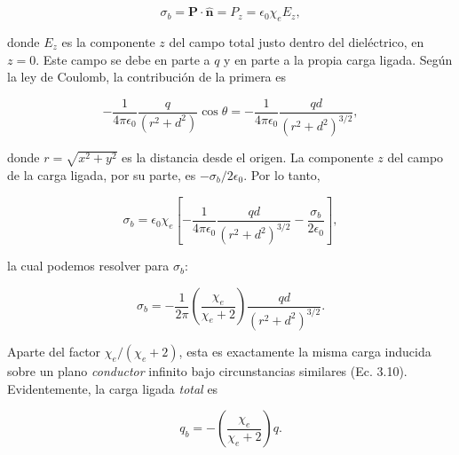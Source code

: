 \documentclass[12pt,a4paper]{report}
\newcommand{\esp}{\vspace{0.5cm}}
\begin{document}
	\esp
	
	\begin{equation}
		\sigma_b = \mathbf{P} \cdot \hat{\mathbf{n}} = P_z = \epsilon_0 \chi_e E_z,
	\end{equation}
	
	\esp
	
	\noindent donde $E_z$ es la componente $z$ del campo total justo dentro del dieléctrico, en $z = 0$. Este campo se debe en parte a $q$ y en parte a la propia carga ligada. Según la ley de Coulomb, la contribución de la primera es
	
	\esp
	
	\begin{equation}
		-\frac{1}{4\pi\epsilon_0} \frac{q}{(r^2 + d^2)} \cos \theta = -\frac{1}{4\pi\epsilon_0} \frac{qd}{(r^2 + d^2)^{3/2}},
	\end{equation}
	
	\esp
	
	\noindent donde $r = \sqrt{x^2 + y^2}$ es la distancia desde el origen. La componente $z$ del campo de la carga ligada, por su parte, es $-\sigma_b/2\epsilon_0$. Por lo tanto,
	
	\esp
	
	\begin{equation}
		\sigma_b = \epsilon_0 \chi_e \left[ -\frac{1}{4\pi\epsilon_0} \frac{qd}{(r^2 + d^2)^{3/2}} - \frac{\sigma_b}{2\epsilon_0} \right],
	\end{equation}
	
	\esp
	
	\noindent la cual podemos resolver para $\sigma_b$:
	
	\esp
	
	\begin{equation}
		\sigma_b = -\frac{1}{2\pi} \left( \frac{\chi_e}{\chi_e + 2} \right) \frac{qd}{(r^2 + d^2)^{3/2}}.
	\end{equation}
	
	\esp
	
	\noindent Aparte del factor $\chi_e/(\chi_e + 2)$, esta es exactamente la misma carga inducida sobre un plano \textit{conductor} infinito bajo circunstancias similares (Ec. 3.10). Evidentemente, la carga ligada \textit{total} es
	
	\esp
	
	\begin{equation}
		q_b = -\left( \frac{\chi_e}{\chi_e + 2} \right) q.
	\end{equation}
	
	\esp
	
\end{document}
